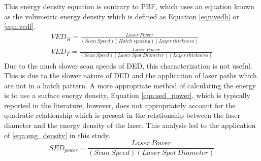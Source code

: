 This energy density equation is contrary to \ac{PBF}, which uses an equation known as the volumetric energy density which is defined as Equation \ref{eqn:vedh} or \ref{eqn:vedf}.
\begin{align}
	VED_H = \frac{Laser\ Power}{(Scan\ Speed)  (Hatch\ spacing)  (Layer\ thickness)} \label{eqn:vedh}\\
	VED_F = \frac{Laser\ Power}{(Scan\ Speed) (Laser\ Spot\ Diameter) (Layer\ thickness)} \label{eqn:vedf}
\end{align}
Due to the much slower scan speeds of \ac{DED}, this characterization is not useful.  This is due to the slower nature of \ac{DED} and the application of laser paths which are not in a hatch pattern.  A more appropriate method of calculating the energy is to use a surface energy density,  
Equation \ref{eqn:sed_power}, which is typically reported in the literature, however, does not appropriately account for the quadratic relationship which is present in the relationship between the laser diameter and the energy density of the laser.  This analysis led to the application of \ref{eqn:eng_density} in this study.
\begin{equation}
	SED_{power} = \frac{Laser\ Power}{(Scan\ Speed) (Laser\ Spot\ Diameter)} \label{eqn:sed_power}
\end{equation}


